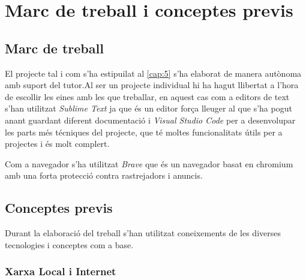 \chapter{Marc de treball i conceptes previs}
\section{Marc de treball}

El projecte tal i com s'ha estipuilat al \autoref{cap:5} s'ha elaborat de manera autònoma amb suport del tutor.Al ser un projecte individual hi ha hagut llibertat a l'hora de escollir les eines amb les que treballar, en aquest cas com a editors de text s'han utilitzat \textit{Sublime Text} ja que és un editor força lleuger al que s'ha pogut anant guardant diferent documentació i \textit{Visual Studio Code} per a desenvolupar les parts més técniques del projecte, que té moltes funcionalitats útils per a projectes i és molt complert.

Com a navegador s'ha utilitzat \textit{Brave} que és un navegador basat en chromium amb una forta protecció contra rastrejadors i anuncis.


\section{Conceptes previs}

Durant la elaboració del treball s'han utilitzat coneixements de les diverses tecnologies i conceptes com a base.

\subsection{Xarxa Local i Internet}
\label{xarxa}

